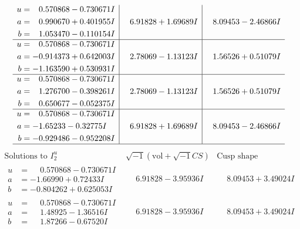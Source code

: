 \documentclass[1p]{elsarticle_modified}
\theoremstyle{definition}
\newcommand{\I}{\sqrt{-1}}
\begin{document}
$$\begin{array}{c|c|c}
\begin{aligned}
u &= \phantom{-}0.570868 - 0.730671 I \\
a &= \phantom{-}0.990670 + 0.401955 I \\
b &= \phantom{-}1.053470 - 0.110154 I\end{aligned}
 & \phantom{-}6.91828 + 1.69689 I & \phantom{-}8.09453 - 2.46866 I \\ \hline\begin{aligned}
u &= \phantom{-}0.570868 - 0.730671 I \\
a &= -0.914373 + 0.642003 I \\
b &= -1.163590 + 0.530931 I\end{aligned}
 & \phantom{-}2.78069 - 1.13123 I & \phantom{-}1.56526 + 0.51079 I \\ \hline\begin{aligned}
u &= \phantom{-}0.570868 - 0.730671 I \\
a &= \phantom{-}1.276700 - 0.398261 I \\
b &= \phantom{-}0.650677 - 0.052375 I\end{aligned}
 & \phantom{-}2.78069 - 1.13123 I & \phantom{-}1.56526 + 0.51079 I \\ \hline\begin{aligned}
u &= \phantom{-}0.570868 - 0.730671 I \\
a &= -1.65233 - 0.32775 I \\
b &= -0.929486 - 0.952208 I\end{aligned}
 & \phantom{-}6.91828 + 1.69689 I & \phantom{-}8.09453 - 2.46866 I\\
 \hline 
 \end{array}$$\newpage$$\begin{array}{c|c|c}  
\text{Solutions to }I^u_{2}& \I (\text{vol} + \sqrt{-1}CS) & \text{Cusp shape}\\
 \hline 
\begin{aligned}
u &= \phantom{-}0.570868 - 0.730671 I \\
a &= -1.66990 + 0.72433 I \\
b &= -0.804262 + 0.625053 I\end{aligned}
 & \phantom{-}6.91828 - 3.95936 I & \phantom{-}8.09453 + 3.49024 I \\ \hline\begin{aligned}
u &= \phantom{-}0.570868 - 0.730671 I \\
a &= \phantom{-}1.48925 - 1.36516 I \\
b &= \phantom{-}1.87266 - 0.67520 I\end{aligned}
 & \phantom{-}6.91828 - 3.95936 I & \phantom{-}8.09453 + 3.49024 I \\ \hline\begin{aligned}

\end{aligned}
\end{array}$$
\end{document}
